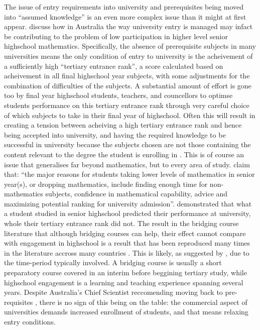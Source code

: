 \documentclass[twoside,12pt,a4paper]{report}
\begin{document}
The issue of entry requirements into university and prerequisites being moved into ``assumed knowledge'' is an even more complex issue than it might at first appear.  discuss how in Australia the way university entry is managed may infact be contributing to the problem of low participation in higher level senior highschool mathematics. Specifically, the absence of prerequisite subjects in many universities means the only condition of entry to university is the acheivement of a sufficiently high ``tertiary entrance rank'', a score calculated based on acheivement in all final highschool year subjects, with some adjustments for the combination of difficulties of the subjects. A substantial amount of effort is gone too by final year highschool students, teachers, and councellors to optimse students performance on this tertiary entrance rank through very careful choice of which subjects to take in their final year of highschool. Often this will result in creating a tension between acheiving a high tertiary entrance rank and hence being accepted into university, and having the required knowledge to be successful in university because the subjects chosen are not those containing the content relevant to the degree the student is enrolling in \cite{Gordon2013b, Poladian2013}. This is of course an issue that generalises far beyond mathematics, but to every area of study.  claim that: ``the major reasons for students taking lower
levels of mathematics in senior year(s), or dropping mathematics, include finding enough
time for non-mathematics subjects, confidence in mathematical capability, advice and
maximizing potential ranking for university admission''.  demonstrated that what a student studied in senior highschool predicted their performance at university, whole their tertiary entrance rank did not. The result in the bridging course literature that although bridging courses can help, their effect cannot compare with engagement in highschool is a result that has been reproduced many times in the literature accross many countries \cite{Kajander2005, Nicholas2015b, Tariq2002}. This is likely, as suggested by , due to the time-period typically involved. A bridging course is usually a short preparatory course covered in an interim before beggining tertiary study, while highschool engagement is a learning and teaching experience spanning several years. Despite Australia's Chief Scientist reccomending moving back to pre-requisites \cite{Chubb2012}, there is no sign of this being on the table: the commercial aspect of universities demands increased enrollment of students, and that means relaxing entry conditions. 
\end{document}
